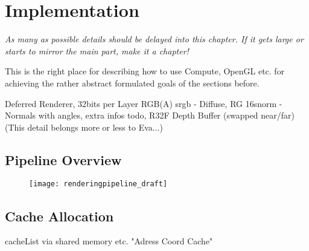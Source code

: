 \documentclass[thesis.tex]{subfiles}
\begin{document}
\section{Implementation}

\emph{As many as possible details should be delayed into this chapter. If it gets large or starts to mirror the main part, make it a chapter!}

This is the right place for describing how to use Compute, OpenGL etc. for achieving the rather abstract formulated goals of the sections before.

Deferred Renderer, 32bits per Layer RGB(A) srgb - Diffuse, RG 16snorm - Normals with angles, extra infos todo, R32F Depth Buffer (swapped near/far)\\
(This detail belongs more or less to Eva...)

\subsection{Pipeline Overview}

\begin{figure}[h]
	\centering
	\texttt{[image: renderingpipeline\_draft]}
\end{figure}



\subsection{Cache Allocation}
cacheList via shared memory etc.
"Adress Coord Cache"

\subfilebib %
\end{document}
